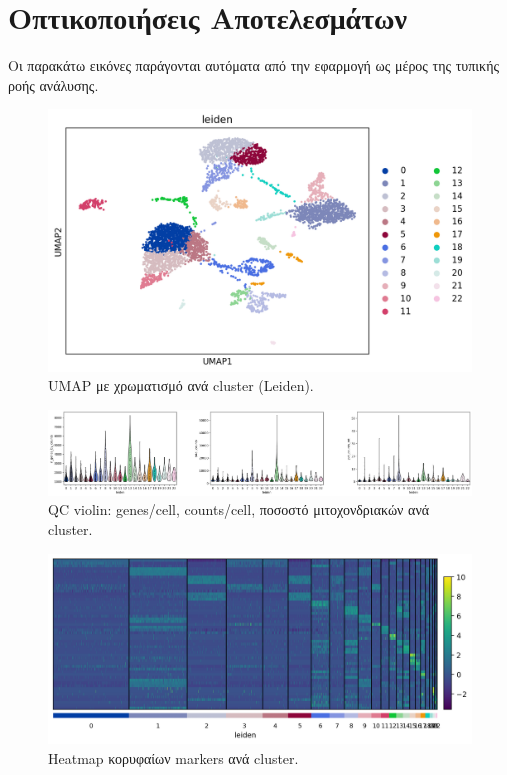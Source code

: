 \documentclass[12pt,a4paper]{article}
\begin{document}
\section{Οπτικοποιήσεις Αποτελεσμάτων}
Οι παρακάτω εικόνες παράγονται αυτόματα από την εφαρμογή ως μέρος της τυπικής ροής ανάλυσης.
\begin{figure}[H]
  \centering
  \includegraphics[width=0.85\linewidth]{figs/umap.png}
  \caption{UMAP με χρωματισμό ανά cluster (Leiden).}
  \label{fig:umap}
\end{figure}
\begin{figure}[H]
  \centering
  \includegraphics[width=0.85\linewidth]{figs/qc_violin.png}
  \caption{QC violin: genes/cell, counts/cell, ποσοστό μιτοχονδριακών ανά cluster.}
  \label{fig:qc}
\end{figure}
\begin{figure}[H]
  \centering
  \includegraphics[width=0.85\linewidth]{figs/markers_heatmap.png}
  \caption{Heatmap κορυφαίων markers ανά cluster.}
  \label{fig:heatmap}
\end{figure}
\end{document}
